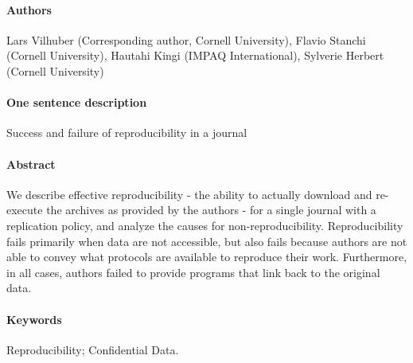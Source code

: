 \paragraph{Authors} Lars Vilhuber  (Corresponding author, Cornell University), Flavio Stanchi  (Cornell University), Hautahi Kingi  (IMPAQ International), Sylverie Herbert  (Cornell University)
\paragraph{One sentence description} Success and failure of reproducibility in a journal
\paragraph{Abstract} We describe effective reproducibility - the ability to actually download and re-execute the archives as provided by the authors - for a single journal with a replication policy, and analyze the causes for non-reproducibility. Reproducibility fails primarily when data are not accessible, but also fails because authors are not able to convey what protocols are available to reproduce their work. Furthermore, in all cases, authors failed to provide programs that link back to the original data. 
\paragraph{Keywords} Reproducibility; Confidential Data.